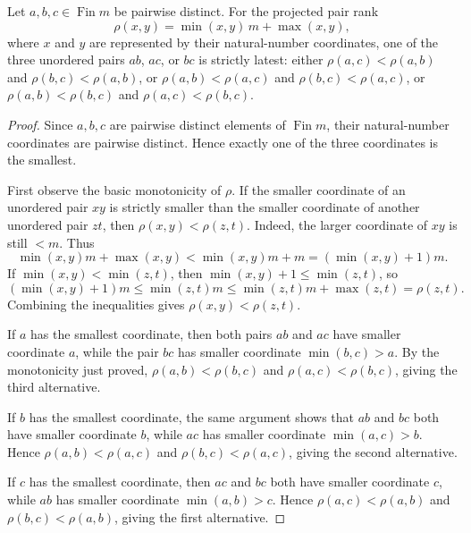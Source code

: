 \begin{helper}
Let \(a,b,c\in\operatorname{Fin}m\) be pairwise distinct.  For the projected
pair rank
\[
  \rho(x,y)=\min(x,y)\,m+\max(x,y),
\]
where \(x\) and \(y\) are represented by their natural-number coordinates, one
of the three unordered pairs \(ab\), \(ac\), or \(bc\) is strictly latest:
either \(\rho(a,c)<\rho(a,b)\) and \(\rho(b,c)<\rho(a,b)\), or
\(\rho(a,b)<\rho(a,c)\) and \(\rho(b,c)<\rho(a,c)\), or
\(\rho(a,b)<\rho(b,c)\) and \(\rho(a,c)<\rho(b,c)\).
\end{helper}
\begin{proof}
Since \(a,b,c\) are pairwise distinct elements of \(\operatorname{Fin}m\),
their natural-number coordinates are pairwise distinct.  Hence exactly one of
the three coordinates is the smallest.

First observe the basic monotonicity of \(\rho\).  If the smaller coordinate
of an unordered pair \(xy\) is strictly smaller than the smaller coordinate of
another unordered pair \(zt\), then \(\rho(x,y)<\rho(z,t)\).  Indeed, the
larger coordinate of \(xy\) is still \(<m\).  Thus
\[
  \min(x,y)m+\max(x,y)<\min(x,y)m+m=(\min(x,y)+1)m.
\]
If \(\min(x,y)<\min(z,t)\), then
\(\min(x,y)+1\le \min(z,t)\), so
\[
  (\min(x,y)+1)m\le \min(z,t)m
      \le \min(z,t)m+\max(z,t)=\rho(z,t).
\]
Combining the inequalities gives \(\rho(x,y)<\rho(z,t)\).

If \(a\) has the smallest coordinate, then both pairs \(ab\) and \(ac\) have
smaller coordinate \(a\), while the pair \(bc\) has smaller coordinate
\(\min(b,c)>a\).  By the monotonicity just proved,
\(\rho(a,b)<\rho(b,c)\) and \(\rho(a,c)<\rho(b,c)\), giving the third
alternative.

If \(b\) has the smallest coordinate, the same argument shows that \(ab\) and
\(bc\) both have smaller coordinate \(b\), while \(ac\) has smaller coordinate
\(\min(a,c)>b\).  Hence \(\rho(a,b)<\rho(a,c)\) and
\(\rho(b,c)<\rho(a,c)\), giving the second alternative.

If \(c\) has the smallest coordinate, then \(ac\) and \(bc\) both have smaller
coordinate \(c\), while \(ab\) has smaller coordinate \(\min(a,b)>c\).  Hence
\(\rho(a,c)<\rho(a,b)\) and \(\rho(b,c)<\rho(a,b)\), giving the first
alternative.
\end{proof}
